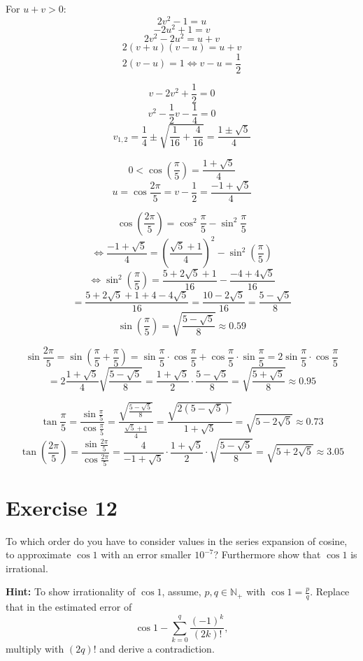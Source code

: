 \documentclass[a4paper]{article}
\theoremstyle{definition}
\begin{document}
For $u + v > 0$:
\[ 2v^2 - 1 =u \]
\[ -2u^2 + 1 = v \]
\[ 2v^2 - 2u^2 = u + v \]
\[ 2(v + u)(v - u) = u + v \]
\[ 2(v - u) = 1 \Leftrightarrow v - u = \frac12 \]

\[ v - 2v^2 + \frac12 = 0 \]
\[ v^2 - \frac12 v - \frac14 = 0 \]
\[ v_{1,2} = \frac14 \pm \sqrt{\frac{1}{16} + \frac{4}{16}} = \frac{1 \pm \sqrt{5}}{4} \]

\[ 0 < \cos(\frac\pi5) = \frac{1 + \sqrt{5}}{4} \]
\[ u = \cos\frac{2\pi}{5} = v - \frac12 = \frac{-1 + \sqrt{5}}{4} \]

\[ \cos\left(\frac{2\pi}{5}\right) = \cos^2{\frac{\pi}{5}} - \sin^2{\frac{\pi}{5}} \]
\[ \Leftrightarrow \frac{-1 + \sqrt{5}}{4} = \left(\frac{\sqrt{5} + 1}{4}\right)^2 - \sin^2\left(\frac{\pi}{5}\right) \]
\[ \Leftrightarrow \sin^2\left(\frac{\pi}{5}\right) = \frac{5 + 2 \sqrt{5} + 1}{16} - \frac{-4 + 4\sqrt{5}}{16} \]
\[ = \frac{5 + 2\sqrt{5} + 1 + 4 - 4\sqrt{5}}{16} = \frac{10 - 2\sqrt{5}}{16} = \frac{5 - \sqrt{5}}{8} \]
\[ \sin\left(\frac{\pi}{5}\right) = \sqrt{\frac{5 - \sqrt{5}}{8}} \approx 0.59 \]

\[
  \sin\frac{2\pi}{5} = \sin\left(\frac{\pi}{5} + \frac{\pi}{5}\right) = \sin{\frac\pi5} \cdot \cos{\frac\pi5}
    + \cos{\frac\pi5} \cdot \sin{\frac\pi5} = 2 \sin{\frac\pi5} \cdot \cos{\frac\pi5}
\] \[
  = 2 \frac{1 + \sqrt{5}}{4} \sqrt{\frac{5 - \sqrt{5}}{8}} = \frac{1 + \sqrt{5}}{2} \cdot \frac{5 - \sqrt{5}}{8}
  = \sqrt{\frac{5 + \sqrt{5}}{8}} \approx 0.95
\]

\[
  \tan{\frac\pi5} = \frac{\sin{\frac\pi5}}{\cos{\frac\pi5}}
     = \frac{\sqrt{\frac{5 - \sqrt{5}}{8}}}{\frac{\sqrt{5} + 1}{4}} = \frac{\sqrt{2 (5 - \sqrt{5})}}{1 + \sqrt{5}}
     = \sqrt{5 - 2\sqrt{5}} \approx 0.73
\] \[
  \tan\left(\frac{2\pi}{5}\right) = \frac{\sin{\frac{2\pi}{5}}}{\cos{\frac{2\pi}{5}}}
     = \frac{4}{-1 + \sqrt{5}} \cdot \frac{1 + \sqrt{5}}{2} \cdot \sqrt{\frac{5 - \sqrt{5}}{8}}
     = \sqrt{5 + 2\sqrt{5}} \approx 3.05
\]

\section{Exercise 12}
\begin{ex}
  To which order do you have to consider values in the series expansion of cosine,
  to approximate $\cos{1}$ with an error smaller $10^{-7}$?
  Furthermore show that $\cos{1}$ is irrational.

  \textbf{Hint:} To show irrationality of $\cos{1}$, assume, $p,q \in \mathbb N_+$ with
  $\cos{1} = \frac pq$. Replace that in the estimated error of
  \[ \cos{1} - \sum_{k=0}^q \frac{(-1)^k}{(2k)!}, \]
  multiply with $(2q)!$ and derive a contradiction.
\end{ex}
\end{document}
